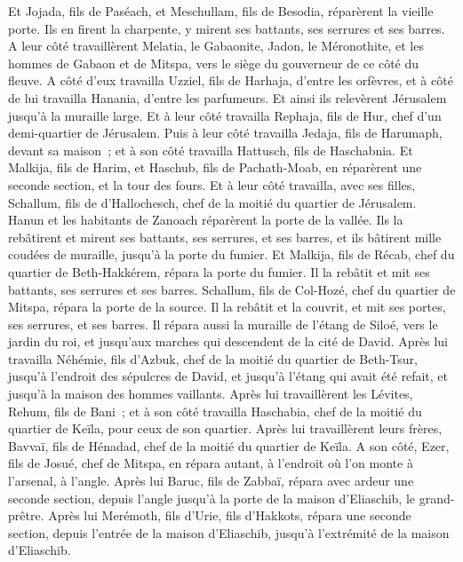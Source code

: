 \begin{multicols}{2}
Et Jojada, fils de Paséach, et Meschullam, fils de Besodia, réparèrent la vieille porte. Ils en firent la charpente, y mirent ses battants, ses serrures et ses barres.
A leur côté travaillèrent Melatia, le Gabaonite, Jadon, le Méronothite, et les hommes de Gabaon et de Mitspa, vers le siège du gouverneur de ce côté du fleuve.
A côté d'eux travailla Uzziel, fils de Harhaja, d'entre les orfèvres, et à côté de lui travailla Hanania, d'entre les parfumeurs. Et ainsi ils relevèrent Jérusalem jusqu'à la muraille large.
Et à leur côté travailla Rephaja, fils de Hur, chef d'un demi-quartier de Jérusalem.
Puis à leur côté travailla Jedaja, fils de Harumaph, devant sa maison~; et à son côté travailla Hattusch, fils de Haschabnia.
Et Malkija, fils de Harim, et Haschub, fils de Pachath-Moab, en réparèrent une seconde section, et la tour des fours.
Et à leur côté travailla, avec ses filles, Schallum, fils de d'Hallochesch, chef de la moitié du quartier de Jérusalem.
Hanun et les habitants de Zanoach réparèrent la porte de la vallée. Ils la rebâtirent et mirent ses battants, ses serrures, et ses barres, et ils bâtirent mille coudées de muraille, jusqu'à la porte du fumier.
Et Malkija, fils de Récab, chef du quartier de Beth-Hakkérem, répara la porte du fumier. Il la rebâtit et mit ses battants, ses serrures et ses barres.
Schallum, fils de Col-Hozé, chef du quartier de Mitspa, répara la porte de la source. Il la rebâtit et la couvrit, et mit ses portes, ses serrures, et ses barres. Il répara aussi la muraille de l'étang de Siloé, vers le jardin du roi, et jusqu'aux marches qui descendent de la cité de David.
Après lui travailla Néhémie, fils d'Azbuk, chef de la moitié du quartier de Beth-Tsur, jusqu'à l'endroit des sépulcres de David, et jusqu'à l'étang qui avait été refait, et jusqu'à la maison des hommes vaillants.
Après lui travaillèrent les Lévites, Rehum, fils de Bani~; et à son côté travailla Haschabia, chef de la moitié du quartier de Keïla, pour ceux de son quartier.
Après lui travaillèrent leurs frères, Bavvaï, fils de Hénadad, chef de la moitié du quartier de Keïla.
A son côté, Ezer, fils de Josué, chef de Mitspa, en répara autant, à l'endroit où l'on monte à l'arsenal, à l'angle.
Après lui Baruc, fils de Zabbaï, répara avec ardeur une seconde section, depuis l'angle jusqu'à la porte de la maison d'Eliaschib, le grand-prêtre.
Après lui Merémoth, fils d'Urie, fils d'Hakkots, répara une seconde section, depuis l'entrée de la maison d'Eliaschib, jusqu'à l'extrémité de la maison d'Eliaschib.

\end{multicols}
